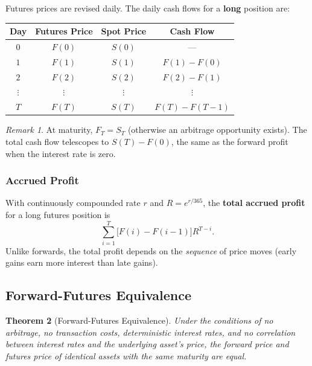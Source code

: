 \documentclass[12pt, a4paper]{article}
\theoremstyle{plain}
\newtheorem{theorem}{Theorem}[section]
\theoremstyle{definition}
\theoremstyle{remark}
\newtheorem{remark}[theorem]{Remark}
\begin{document}
Futures prices are revised daily. The daily cash flows for a \textbf{long} position are:

\begin{center}
\begin{tabular}{cccc}
  \hline
  Day & Futures Price & Spot Price & Cash Flow \\
  \hline
  $0$ & $F(0)$ & $S(0)$ & --- \\
  $1$ & $F(1)$ & $S(1)$ & $F(1)-F(0)$ \\
  $2$ & $F(2)$ & $S(2)$ & $F(2)-F(1)$ \\
  $\vdots$ & $\vdots$ & $\vdots$ & $\vdots$ \\
  $T$ & $F(T)$ & $S(T)$ & $F(T)-F(T-1)$ \\
  \hline
\end{tabular}
\end{center}

\begin{remark}
  At maturity, $F_T = S_T$ (otherwise an arbitrage opportunity exists). The total cash flow telescopes to $S(T) - F(0)$, the same as the forward profit when the interest rate is zero.
\end{remark}

\subsubsection{Accrued Profit}

With continuously compounded rate $r$ and $R = e^{r/365}$, the \textbf{total accrued profit} for a long futures position is
\[
  \sum_{i=1}^T \bigl[F(i) - F(i-1)\bigr] R^{T-i}.
\]
Unlike forwards, the total profit depends on the \emph{sequence} of price moves (early gains earn more interest than late gains).

\subsection{Forward-Futures Equivalence}

\begin{theorem}[Forward-Futures Equivalence]
  Under the conditions of no arbitrage, no transaction costs, deterministic interest rates, and no correlation between interest rates and the underlying asset's price, the forward price and futures price of identical assets with the same maturity are equal.
\end{theorem}
\end{document}
